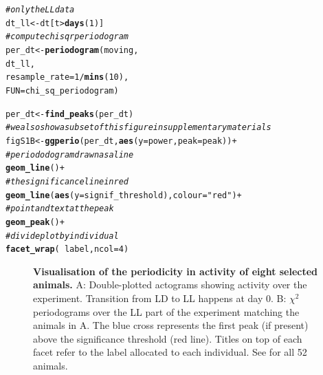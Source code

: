 \documentclass[10pt,letterpaper]{article}\usepackage[]{graphicx}\usepackage[]{color}
\makeatletter
\newcommand{\hlnum}[1]{\textcolor[rgb]{0.686,0.059,0.569}{#1}}%
\newcommand{\hlstr}[1]{\textcolor[rgb]{0.192,0.494,0.8}{#1}}%
\newcommand{\hlcom}[1]{\textcolor[rgb]{0.678,0.584,0.686}{\textit{#1}}}%
\newcommand{\hlopt}[1]{\textcolor[rgb]{0,0,0}{#1}}%
\newcommand{\hlstd}[1]{\textcolor[rgb]{0.345,0.345,0.345}{#1}}%
\newcommand{\hlkwb}[1]{\textcolor[rgb]{0.69,0.353,0.396}{#1}}%
\newcommand{\hlkwc}[1]{\textcolor[rgb]{0.333,0.667,0.333}{#1}}%
\newcommand{\hlkwd}[1]{\textcolor[rgb]{0.737,0.353,0.396}{\textbf{#1}}}%
\newenvironment{kframe}{%
 \def\at@end@of@kframe{}%
 \ifinner\ifhmode%
  \def\at@end@of@kframe{\end{minipage}}%
  \begin{minipage}{\columnwidth}%
 \fi\fi%
 \def\FrameCommand##1{\hskip\@totalleftmargin \hskip-\fboxsep
 \colorbox{shadecolor}{##1}\hskip-\fboxsep
     \hskip-\linewidth \hskip-\@totalleftmargin \hskip\columnwidth}%
 \MakeFramed {\advance\hsize-\width
   \@totalleftmargin\z@ \linewidth\hsize
   \@setminipage}}%
 {\par\unskip\endMakeFramed%
 \at@end@of@kframe}
\newenvironment{knitrout}{}{} %
\makeatother
\begin{document}
\begin{knitrout}
\color{fgcolor}\begin{kframe}
\begin{alltt}
\hlcom{# only the LL data}
\hlstd{dt_ll} \hlkwb{<-} \hlstd{dt[t} \hlopt{>} \hlkwd{days}\hlstd{(}\hlnum{1}\hlstd{)]}
\hlcom{# compute chi sqr periodogram }
\hlstd{per_dt} \hlkwb{<-} \hlkwd{periodogram}\hlstd{(moving,}
                        \hlstd{dt_ll,}
                        \hlkwc{resample_rate} \hlstd{=} \hlnum{1} \hlopt{/} \hlkwd{mins}\hlstd{(}\hlnum{10}\hlstd{),}
                        \hlkwc{FUN}\hlstd{=chi_sq_periodogram)}

\hlstd{per_dt} \hlkwb{<-} \hlkwd{find_peaks}\hlstd{(per_dt)}
\hlcom{# we also show a subset of this figure in supplementary materials}
\hlstd{figS1B} \hlkwb{<-} \hlkwd{ggperio}\hlstd{(per_dt,} \hlkwd{aes}\hlstd{(}\hlkwc{y} \hlstd{= power,} \hlkwc{peak} \hlstd{= peak))} \hlopt{+}
                  \hlcom{# periododogram drawn as a line}
                  \hlkwd{geom_line}\hlstd{()} \hlopt{+}
                  \hlcom{# the significance line in red}
                  \hlkwd{geom_line}\hlstd{(}\hlkwd{aes}\hlstd{(}\hlkwc{y} \hlstd{= signif_threshold),} \hlkwc{colour} \hlstd{=} \hlstr{"red"}\hlstd{)} \hlopt{+}
                  \hlcom{# point and text at the peak}
                  \hlkwd{geom_peak}\hlstd{()} \hlopt{+}
                  \hlcom{# divide plot by individual}
                  \hlkwd{facet_wrap}\hlstd{(} \hlopt{~} \hlstd{label,} \hlkwc{ncol} \hlstd{=} \hlnum{4}\hlstd{)}
\end{alltt}
\end{kframe}
\end{knitrout}







\begin{figure}[!h]
	\caption{{\bf Visualisation of the periodicity in activity of eight selected animals.}
		A: Double-plotted actograms showing activity over the experiment. Transition from LD to LL happens at day 0.
		B: $\chi{}^2$ periodograms over the LL part of the experiment matching the animals in A.
		The blue cross represents the first peak (if present) above the significance threshold (red line).
		Titles on top of each facet refer to the label allocated to each individual.
		See  for all 52 animals.
	}
	\label{fig:fig-4}
\end{figure}
\end{document}
